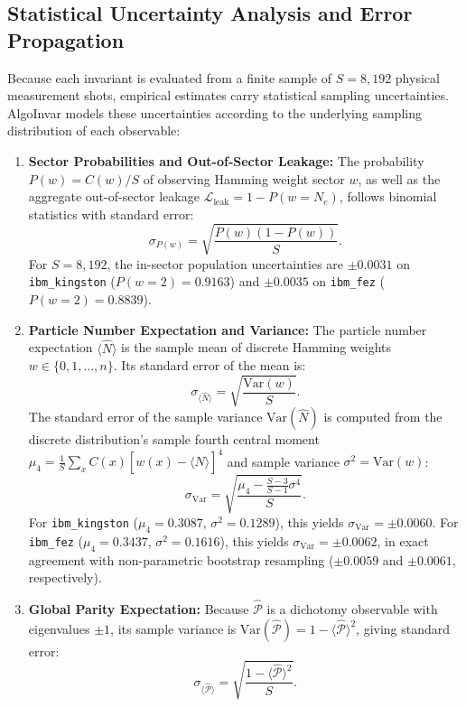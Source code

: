 \documentclass[aps,pra,reprint,superscriptaddress,floatfix,nofootinbib]{revtex4-2}
\begin{document}
\subsection{Statistical Uncertainty Analysis and Error Propagation}
Because each invariant is evaluated from a finite sample of $S = 8,192$ physical measurement shots, empirical estimates carry statistical sampling uncertainties. AlgoInvar models these uncertainties according to the underlying sampling distribution of each observable:
\begin{enumerate}
    \item \textbf{Sector Probabilities and Out-of-Sector Leakage:} The probability $P(w) = C(w)/S$ of observing Hamming weight sector $w$, as well as the aggregate out-of-sector leakage $\mathcal{L}_{\text{leak}} = 1 - P(w=N_e)$, follows binomial statistics with standard error:
    \begin{equation}
    \sigma_{P(w)} = \sqrt{\frac{P(w)(1 - P(w))}{S}}.
    \end{equation}
    For $S = 8,192$, the in-sector population uncertainties are $\pm 0.0031$ on \texttt{ibm\_kingston} ($P(w=2) = 0.9163$) and $\pm 0.0035$ on \texttt{ibm\_fez} ($P(w=2) = 0.8839$).
    
    \item \textbf{Particle Number Expectation and Variance:} The particle number expectation $\langle \hat{N} \rangle$ is the sample mean of discrete Hamming weights $w \in \{0, 1, \dots, n\}$. Its standard error of the mean is:
    \begin{equation}
    \sigma_{\langle \hat{N} \rangle} = \sqrt{\frac{\text{Var}(w)}{S}}.
    \end{equation}
    The standard error of the sample variance $\text{Var}(\hat{N})$ is computed from the discrete distribution's sample fourth central moment $\mu_4 = \frac{1}{S}\sum_x C(x)[w(x) - \langle \hat{N} \rangle]^4$ and sample variance $\sigma^2 = \text{Var}(w)$:
    \begin{equation}
    \sigma_{\text{Var}} = \sqrt{\frac{\mu_4 - \frac{S-3}{S-1}\sigma^4}{S}}.
    \end{equation}
    For \texttt{ibm\_kingston} ($\mu_4 = 0.3087$, $\sigma^2 = 0.1289$), this yields $\sigma_{\text{Var}} = \pm 0.0060$. For \texttt{ibm\_fez} ($\mu_4 = 0.3437$, $\sigma^2 = 0.1616$), this yields $\sigma_{\text{Var}} = \pm 0.0062$, in exact agreement with non-parametric bootstrap resampling ($\pm 0.0059$ and $\pm 0.0061$, respectively).
    
    \item \textbf{Global Parity Expectation:} Because $\hat{\mathcal{P}}$ is a dichotomy observable with eigenvalues $\pm 1$, its sample variance is $\text{Var}(\hat{\mathcal{P}}) = 1 - \langle \hat{\mathcal{P}} \rangle^2$, giving standard error:
    \begin{equation}
    \sigma_{\langle \hat{\mathcal{P}} \rangle} = \sqrt{\frac{1 - \langle \hat{\mathcal{P}} \rangle^2}{S}}.
    \end{equation}
    

\end{enumerate}
\end{document}
